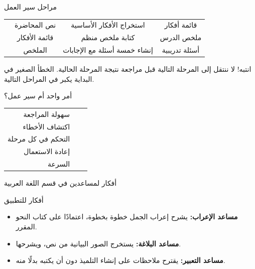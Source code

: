 \documentclass[aspectratio=169, 11pt, xcolor={table}]{beamer}
\begin{document}
\begin{frame}{مراحل سير العمل}
    \small
    \begin{center}
    \begin{tabularx}{\textwidth}{|>{\centering\arraybackslash}p{1.6cm}|C|C|C|}
        \hline
         &  &  &  \\  & نص المحاضرة & استخراج الأفكار الأساسية & قائمة أفكار \\  & قائمة الأفكار & كتابة ملخص منظم & ملخص الدرس \\  & الملخص & إنشاء خمسة أسئلة مع الإجابات & أسئلة تدريبية \\ \hline
    \end{tabularx}
    \end{center}
    \begin{obox}{\faExclamationTriangle\quad انتبه!}
        لا ننتقل إلى المرحلة التالية قبل مراجعة نتيجة المرحلة الحالية.
        الخطأ الصغير في البداية يكبر في المراحل التالية.
    \end{obox}
\end{frame}

\begin{frame}{أمر واحد أم سير عمل؟}
    \begin{center}
    \begin{tabularx}{0.85\textwidth}{|R|C|C|}
        \hline
         &  &  \\ \hline
        سهولة المراجعة         &    &  \\ \hline
        اكتشاف الأخطاء         &     &  \\ \hline
        التحكم في كل مرحلة     &    &  \\ \hline
        إعادة الاستعمال        &   &  \\ \hline
        السرعة                 &  &  \\ \hline
    \end{tabularx}
    \end{center}
\end{frame}

\begin{frame}{أفكار لمساعدين في قسم اللغة العربية}
    \begin{tbox}{\faChalkboardTeacher\quad أفكار للتطبيق}
        \begin{itemize}
            \item \textbf{مساعد الإعراب:} يشرح إعراب الجمل خطوة بخطوة، اعتمادًا على كتاب النحو المقرر.
            \item \textbf{مساعد البلاغة:} يستخرج الصور البيانية من نص، ويشرحها.
            \item \textbf{مساعد التعبير:} يقترح ملاحظات على إنشاء التلميذ دون أن يكتبه بدلًا منه.
        \end{itemize}
    \end{tbox}
\end{frame}
\end{document}
